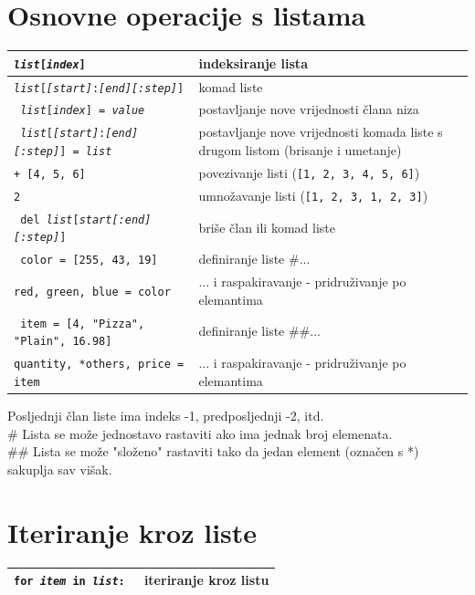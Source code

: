 \documentclass[10pt]{article}
\begin{document}
    \section*{\color{NavyBlue} Osnovne operacije s listama}
    \begin{tabular}{|>{\tt}p{9.00cm}|>{}p{15.50cm}|}
        \hline
        \textit{list}[\textit{index}] & indeksiranje lista 
        \\ \hline
        \textit{list}[\textit{[start]}:\textit{[end]}\textit{[:step]}] & komad liste 
        \\ \hline
        \textit{list}[\textit{index}] = \textit{value} & postavljanje nove vrijednosti člana niza
        \\ \hline
        \textit{list}[\textit{[start]}:\textit{[end]}\textit{[:step]}] = \textit{list} & postavljanje nove vrijednosti komada liste s drugom listom (brisanje i umetanje)
        \\ \hline
        [1, 2, 3] + [4, 5, 6] & povezivanje listi (\texttt{[1, 2, 3, 4, 5, 6]})
        \\ \hline
        [1, 2, 3] * 2 & umnožavanje listi (\texttt{[1, 2, 3, 1, 2, 3]})
        \\ \hline
        del \textit{list}[\textit{start}\textit{[:end]}\textit{[:step]}] & briše član ili komad liste
        \\ \hline
        color = [255, 43, 19] & definiranje liste \#...
        \\
        red, green, blue = color & ... i raspakiravanje - pridruživanje po elemantima
        \\ \hline
        item = [4, "Pizza", "Plain", 16.98] & definiranje liste \#\#...
        \\
        quantity, *others, price = item & ... i raspakiravanje - pridruživanje po elemantima
        \\ \hline
    \end{tabular}
    \begin{center}
        \footnotesize
        Posljednji član liste ima indeks -1, predposljednji -2, itd. \\
        \# Lista se može jednostavo rastaviti ako ima jednak broj elemenata. \\
        \#\# Lista se može "složeno" rastaviti tako da jedan element (označen s *) sakuplja sav višak.
    \end{center}

    \section*{\color{NavyBlue} Iteriranje kroz liste}
    \begin{tabular}{|>{\tt}p{9.00cm}|>{}p{15.50cm}|}
        \hline
        for \textit{item} in \textit{list}: & iteriranje kroz listu
        \\ \hline
    \end{tabular}
\end{document}
